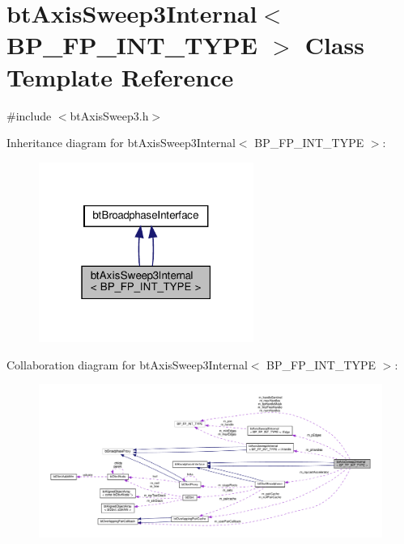 \hypertarget{classbtAxisSweep3Internal}{}\section{bt\+Axis\+Sweep3\+Internal$<$ B\+P\+\_\+\+F\+P\+\_\+\+I\+N\+T\+\_\+\+T\+Y\+PE $>$ Class Template Reference}
\label{classbtAxisSweep3Internal}


{\ttfamily \#include $<$bt\+Axis\+Sweep3.\+h$>$}



Inheritance diagram for bt\+Axis\+Sweep3\+Internal$<$ B\+P\+\_\+\+F\+P\+\_\+\+I\+N\+T\+\_\+\+T\+Y\+PE $>$\+:
\nopagebreak
\begin{figure}[H]
\begin{center}
\leavevmode
\includegraphics[width=199pt]{classbtAxisSweep3Internal__inherit__graph}
\end{center}
\end{figure}


Collaboration diagram for bt\+Axis\+Sweep3\+Internal$<$ B\+P\+\_\+\+F\+P\+\_\+\+I\+N\+T\+\_\+\+T\+Y\+PE $>$\+:
\nopagebreak
\begin{figure}[H]
\begin{center}
\leavevmode
\includegraphics[width=350pt]{classbtAxisSweep3Internal__coll__graph}
\end{center}
\end{figure}
